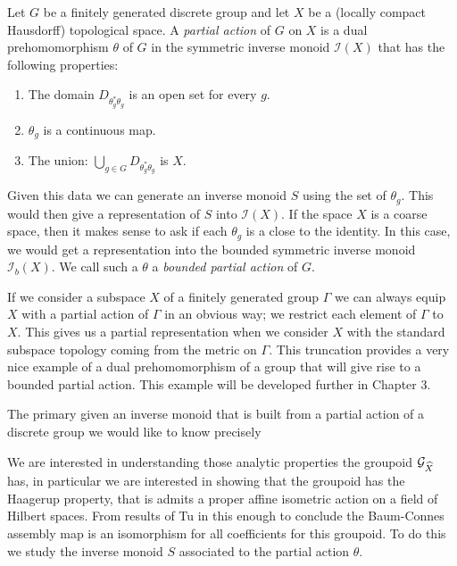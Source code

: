 \begin{definition}
Let $G$ be a finitely generated discrete group and let $X$ be a (locally compact Hausdorff) topological space. A \textit{partial action} of $G$ on $X$ is a dual prehomomorphism $\theta$ of $G$ in the symmetric inverse monoid $\mathcal{I}(X)$ that has the following properties:
\begin{enumerate}
\item The domain $D_{\theta_{g}^{*}\theta_{g}}$ is an open set for every $g$.
\item $\theta_{g}$ is a continuous map.
\item The union: $\bigcup_{g \in G}D_{\theta_{g}^{*}\theta_{g}}$ is $X$.
\end{enumerate}
\end{definition}

Given this data we can generate an inverse monoid $S$ using the set of $\theta_{g}$. This would then give a representation of $S$ into $\mathcal{I}(X)$. If the space $X$ is a coarse space, then it makes sense to ask if each $\theta_{g}$ is a close to the identity. In this case, we would get a representation into the bounded symmetric inverse monoid $\mathcal{I}_{b}(X)$. We call such a $\theta$ a \textit{bounded partial action} of $G$.

\begin{example}
If we consider a subspace $X$ of a finitely generated group $\Gamma$ we can always equip $X$ with a partial action of $\Gamma$ in an obvious way; we restrict each element of $\Gamma$ to $X$. This gives us a partial representation when we consider $X$ with the standard subspace topology coming from the metric on $\Gamma$. This truncation provides a very nice example of a dual prehomomorphism of a group that will give rise to a bounded partial action. This example will be developed further in Chapter 3.
\end{example}
 
The primary given an inverse monoid that is built from a partial action of a discrete group we would like to know precisely

We are interested in understanding those analytic properties the groupoid $\mathcal{G}_{\widehat{X}}$ has, in particular we are interested in showing that the groupoid has the Haagerup property, that is admits a proper affine isometric action on a field of Hilbert spaces. From results of Tu in \cite{MR1703305} this enough to conclude the Baum-Connes assembly map is an isomorphism for all coefficients for this groupoid. To do this we study the inverse monoid $S$ associated to the partial action $\theta$.

